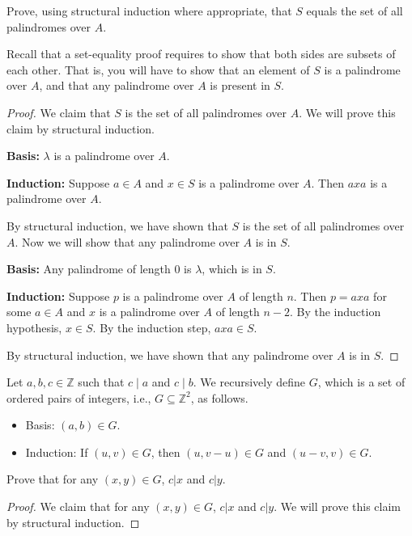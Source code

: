 \documentclass[a4paper]{exam}
\begin{document}
\begin{questions}
  Prove, using structural induction where appropriate, that $S$ equals the set of all palindromes over $A$.

  Recall that a set-equality proof requires to show that both sides are subsets of each other. That is, you will have to show that an element of $S$ is a palindrome over $A$, and that any palindrome over $A$ is present in $S$.

  \begin{solution}
    \begin{proof}
      We claim that $S$ is the set of all palindromes over $A$. We will prove this claim by structural induction.

      \textbf{Basis:} $\lambda$ is a palindrome over $A$.

      \textbf{Induction:} Suppose $a \in A$ and $x \in S$ is a palindrome over $A$. Then $axa$ is a palindrome over $A$.

      By structural induction, we have shown that $S$ is the set of all palindromes over $A$. Now we will show that any palindrome over $A$ is in $S$.

      \textbf{Basis:} Any palindrome of length 0 is $\lambda$, which is in $S$.

      \textbf{Induction:} Suppose $p$ is a palindrome over $A$ of length $n$. Then $p = axa$ for some $a \in A$ and $x$ is a palindrome over $A$ of length $n-2$. By the induction hypothesis, $x \in S$. By the induction step, $axa \in S$.

      By structural induction, we have shown that any palindrome over $A$ is in $S$.
    \end{proof}
  \end{solution}

\question
  Let $a, b, c \in \mathbb{Z}$ such that $c\mid a$ and $c\mid b$. We recursively define $G$, which is a set of ordered pairs of integers, i.e., $G \subseteq \mathbb{Z}^2$, as follows.
  \begin{itemize}
  \item Basis: $(a, b) \in G$.
  \item Induction: If $(u, v) \in G$, then $(u, v - u) \in G$ and $(u - v, v) \in G$.
  \end{itemize}

  Prove that for any $(x, y) \in G$, $c|x$ and $c|y$.

  \begin{solution}
    \begin{proof}
      We claim that for any $(x, y) \in G$, $c|x$ and $c|y$. We will prove this claim by structural induction.


\end{proof}
\end{solution}
\end{questions}
\end{document}
